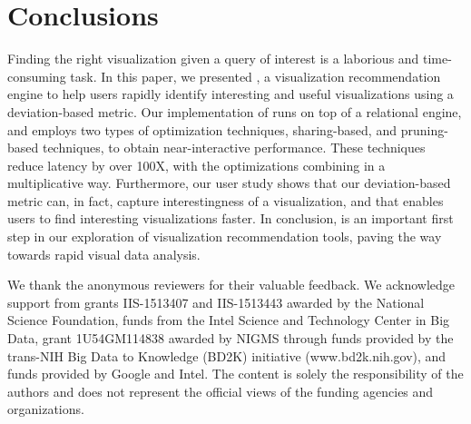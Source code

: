 
\section{Conclusions}
\label{sec:conc}

Finding the right visualization given a query of interest is a
laborious and time-consuming task.
In this paper, we presented \SeeDB, a visualization recommendation
engine to help users 
rapidly identify interesting and useful visualizations using a deviation-based 
metric.
Our implementation of \SeeDB runs on top of a relational engine, and employs two types of optimization 
techniques, sharing-based, and pruning-based techniques, to obtain near-interactive performance.
These techniques reduce latency by over 100X, with the optimizations combining in a multiplicative way. 
Furthermore, our user study shows that our deviation-based metric can, in fact, capture interestingness of a 
visualization, and that \SeeDB enables users to find interesting visualizations faster.
In conclusion, \SeeDB is an important first step in our exploration of 
visualization recommendation tools, 
paving the way towards rapid visual data analysis.

We thank the anonymous reviewers for their valuable feedback. We acknowledge support from grants IIS-1513407 and IIS-1513443 awarded by the National Science Foundation, funds from the Intel Science and Technology Center in Big Data, 
grant 1U54GM114838 awarded by NIGMS through funds provided by the trans-NIH Big Data to Knowledge (BD2K) initiative \break 
(www.bd2k.nih.gov), and funds provided by Google and Intel. The content is solely the responsibility of the authors and does not represent the official views of the funding agencies and organizations.


